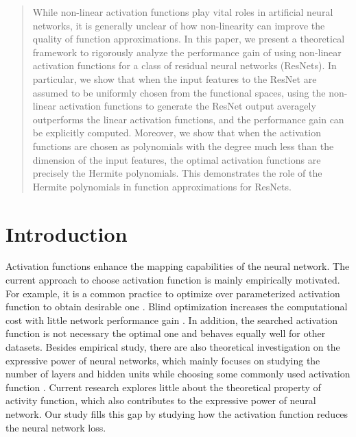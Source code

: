 \documentclass[conference]{IEEEtran}
\begin{document}
\begin{abstract}
While non-linear activation functions play vital roles in artificial neural networks, it is generally unclear of how non-linearity can improve the quality of function approximations.
In this paper, we present a theoretical framework to rigorously analyze the performance gain of using non-linear activation functions for a class of residual neural networks (ResNets). In particular, we show that when the input features to the ResNet are assumed to be uniformly chosen from the functional spaces, using the non-linear activation functions to generate the ResNet output averagely outperforms the linear activation functions, and the performance gain can be explicitly computed. Moreover, we show that when the activation functions are chosen as polynomials with the degree much less than the dimension of the input features, the optimal activation functions are precisely the Hermite polynomials. This demonstrates the role of the Hermite polynomials in function approximations for ResNets.
\end{abstract}



\section{Introduction}
Activation functions
enhance the mapping capabilities of the neural network.
The current approach to choose
activation function is mainly empirically motivated.
For example, it is a common practice to optimize over parameterized activation function to obtain desirable one \cite{ramachandran2017searching}.
Blind optimization increases the computational cost with little network performance gain \cite{laudani2015training}. In addition, the searched activation function is not necessary the optimal one and behaves equally well for other datasets.
Besides empirical study, there are also theoretical investigation on the expressive power of neural networks, which mainly focuses on studying the number of layers and hidden units while choosing some commonly used activation function \cite{AroraBMM18}. Current research explores little about the theoretical property of activity function, which also contributes to the expressive power of neural network. Our study fills this gap by studying how the activation function reduces the neural network loss.
\end{document}
